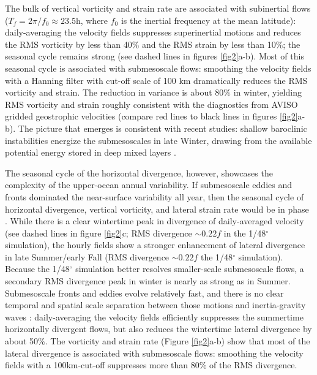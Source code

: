 \documentclass[grl]{agutex2015}
\begin{document}
\begin{article}
The bulk of vertical vorticity and strain rate are associated with subinertial flows
($T_f = 2\pi/f_0\approx 23.5$h, where $f_0$ is the inertial frequency at
the mean latitude): daily-averaging the velocity fields suppresses superinertial
motions and reduces the RMS
vorticity by less than 40$\%$ and the RMS strain by less than 10$\%$; the seasonal
cycle remains strong (see
dashed lines in figures \ref{fig2}a-b). Most of this seasonal cycle is associated
with submesoscale flows: smoothing the velocity fields
with a Hanning filter with cut-off scale of 100 km dramatically reduces the RMS
vorticity and strain. The reduction in variance is about 80$\%$ in winter,
yielding RMS vorticity and strain roughly consistent with the diagnostics from
AVISO gridded geostrophic velocities (compare red lines to black lines in figures \ref{fig2}a-b).
The picture that emerges is consistent with recent studies: shallow baroclinic
instabilities energize the submesoscales in late Winter, drawing from the available
potential energy stored in deep mixed layers \citep{sasaki_etal2014,callies_etal2015,callies_etal2016}.

The seasonal cycle of the horizontal divergence, however, showcases the complexity
of the upper-ocean annual variability. If submesoscale eddies and fronts dominated
the near-surface variability all year, then the seasonal cycle of horizontal divergence,
vertical vorticity, and lateral strain rate would be in phase \citep[e.g.,][]{sasaki_etal2014}.
While there is a clear wintertime peak in divergence of daily-averaged velocity
(see dashed lines in figure \ref{fig2}c; RMS divergence $\sim0.22 f$ in the 1/48$^\circ$
simulation), the hourly fields show
a stronger enhancement of
lateral divergence in late Summer/early Fall (RMS divergence $\sim0.22 f$ the 1/48$^\circ$
simulation). Because the 1/48$^\circ$ simulation better resolves
smaller-scale submesoscale flows, a secondary RMS divergence peak in winter  is
nearly as strong as in Summer. Submesoscale fronts and eddies evolve
relatively fast, and there is no clear
temporal and spatial scale separation between those motions and inertia-gravity waves
\citep{mcwilliams2016}:
daily-averaging the velocity fields efficiently suppresses the summertime horizontally
divergent flows, but also reduces the wintertime lateral divergence by about 50$\%$.
The vorticity and strain rate (Figure \ref{fig2}a-b) show that most of the lateral divergence is associated
with submesoscale flows: smoothing the velocity fields with a 100km-cut-off
suppresses more than 80$\%$ of the RMS divergence.


\end{article}
\end{document}
